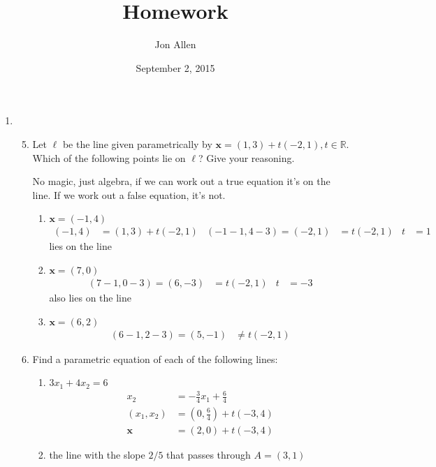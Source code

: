 \documentclass[letterpaper]{article}
\begin{document}
\title{Homework}
\date{September 2, 2015}
\author{Jon Allen}
\maketitle
\renewcommand{\labelenumi}{1.\arabic{enumi}}
\renewcommand{\labelenumii}{\arabic{enumii}.}
\renewcommand{\labelenumiii}{(\alph{enumiii})}
\begin{enumerate}
\item
  \begin{enumerate}
  \setcounter{enumii}{4}
  \item
  Let $\ell$ be the line given parametrically by $\mathbf{x}=(1,3)+t(-2,1),t\in \mathbb{R}$. Which of the following points lie on $\ell$? Give your reasoning.

  No magic, just algebra, if we can work out a true equation it's on the line. If we work out a false equation, it's not.
    \begin{enumerate}
    \item
    $\mathbf{x}=(-1,4)$
    \begin{align*}
      (-1,4)&=(1,3)+t(-2,1) & (-1-1,4-3)=(-2,1)&=t(-2,1) & t&=1
    \end{align*}
    lies on the line
    \item
    $\mathbf{x}=(7,0)$
    \begin{align*}
      (7-1,0-3)=(6,-3)&=t(-2,1)&t&=-3
    \end{align*}
    also lies on the line
    \item
    $\mathbf{x}=(6,2)$
    \begin{align*}
      (6-1,2-3)=(5,-1)&\ne t(-2,1)
    \end{align*}
    \end{enumerate}
  \item
  Find a parametric equation of each of the following lines:
    \begin{enumerate}
    \item
    $3x_1+4x_2=6$
    \begin{align*}
      x_2&=-\frac{3}{4}x_1+\frac{6}{4}\\
      (x_1,x_2)&=(0,\frac{6}{4})+t(-3,4)\\
      \mathbf{x}&=(2,0)+t(-3,4)
    \end{align*}
    \setcounter{enumiii}{2}
    \item
    the line with the slope $2/5$ that passes through $A=(3,1)$
    \begin{align*}

\end{align*}
\end{enumerate}
\end{enumerate}
\end{enumerate}
\end{document}
